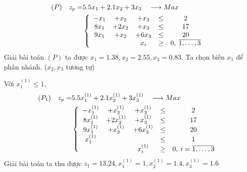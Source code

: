\documentclass[12pt,a4paper]{report}
\begin{document}
    \begin{equation*}
    \begin{split}
    (P) \quad z_p= & 5.5x_1 + 2.1x_2 + 3x_3 \quad \longrightarrow Max \\
    & \left\{\begin{array} {ccccc}
     -x_1 &+ x_2 &+ x_3 &\leq& 2 \\
     8x_1 &+ 2x_2 &+ x_3&\leq& 17 \\
     9x_1 &+ x_2 &+ 6x_3 &\leq& 20 \\
    &&x_i &\geq& 0 , \: \overline{\rm 1, \ldots ,3} \\
    \end{array}\right. \\
    \end{split}
    \end{equation*}
    Giải bài toán $(P)$ ta được $x_1=1.38, x_2=2.55, x_3=0.83$. Ta chọn biến $x_1$ để phân nhánh. ($x_2, x_3$ tương tự)
    
    Với $x^{(1)}_1 \leq 1$, \\ 
    \begin{equation*}
    \begin{split}
      (P_1) \quad z_p= & 5.5x^{(1)}_1 + 2.1x^{(1)}_2 + 3x^{(1)}_3 \quad \longrightarrow Max \\
      & \left\{\begin{array} {ccccc}
       -x^{(1)}_1 &+ x^{(1)}_2 &+ x^{(1)}_3 &\leq& 2 \\
       8x^{(1)}_1 &+ 2x^{(1)}_2 &+ x^{(1)}_3&\leq& 17 \\
       9x^{(1)}_1 &+ x^{(1)}_2 &+ 6x^{(1)}_3 &\leq& 20 \\
       x^{(1)}_1 &&&\leq &1 \\
      &&x^{(1)}_i &\geq& 0 , \: i=\overline{\rm 1, \ldots ,3} \\
      \end{array}\right. \\
    \end{split}
    \end{equation*}
    Giải bài toán ta thu được $z_1=13.24, x^{(1)}_1=1, x^{(1)}_2=1.4, x^{(1)}_3=1.6$
    
    
    
\end{document}

